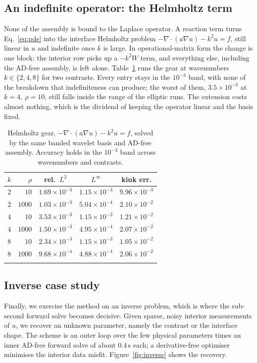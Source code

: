 \documentclass[pdflatex,sn-mathphys-num]{sn-jnl}%
\theoremstyle{thmstyleone}%
\theoremstyle{thmstyletwo}%
\theoremstyle{thmstylethree}%
\begin{document}
\subsection{An indefinite operator: the Helmholtz term}\label{subsec:helmholtz}
None of the assembly is bound to the Laplace operator. A reaction term turns Eq.~\eqref{eq:pde} into the interface Helmholtz problem $-\nabla\!\cdot\!(a\nabla u)-k^2 u = f$, still linear in $u$ and indefinite once $k$ is large. In operational-matrix form the change is one block: the interior row picks up a $-k^2 W$ term, and everything else, including the AD-free assembly, is left alone. Table~\ref{tab:helmholtz} runs the gear at wavenumbers $k\in\{2,4,8\}$ for two contrasts. Every entry stays in the $10^{-3}$ band, with none of the breakdown that indefiniteness can produce; the worst of them, $3.5\times10^{-3}$ at $k=4,\ \rho=10$, still falls inside the range of the elliptic runs. The extension costs almost nothing, which is the dividend of keeping the operator linear and the basis fixed.

\begin{table}[t]
\caption{Helmholtz gear, $-\nabla\!\cdot\!(a\nabla u)-k^2u=f$, solved by the same banded wavelet basis and AD-free assembly. Accuracy holds in the $10^{-3}$ band across wavenumbers and contrasts.}\label{tab:helmholtz}%
\begin{tabular}{@{}rrccc@{}}
\toprule
$k$ & $\rho$ & rel.\ $L^2$ & $L^\infty$ & kink err. \\
\midrule
$2$ & $10$   & $1.69\times10^{-3}$ & $1.15\times10^{-3}$ & $9.96\times10^{-3}$ \\
$2$ & $1000$ & $1.03\times10^{-3}$ & $5.04\times10^{-4}$ & $2.10\times10^{-2}$ \\
$4$ & $10$   & $3.53\times10^{-3}$ & $1.15\times10^{-3}$ & $1.21\times10^{-2}$ \\
$4$ & $1000$ & $1.50\times10^{-3}$ & $4.95\times10^{-4}$ & $2.07\times10^{-2}$ \\
$8$ & $10$   & $2.34\times10^{-3}$ & $1.15\times10^{-3}$ & $1.05\times10^{-2}$ \\
$8$ & $1000$ & $9.68\times10^{-4}$ & $4.88\times10^{-4}$ & $2.06\times10^{-2}$ \\
\botrule
\end{tabular}
\end{table}

\subsection{Inverse case study}\label{subsec:inverse}
Finally, we exercise the method on an inverse problem, which is where the sub-second forward solve becomes decisive. Given sparse, noisy interior measurements of $u$, we recover an unknown parameter, namely the contrast or the interface shape. The scheme is an outer loop over the few physical parameters times an inner AD-free forward solve of about $0.4$\,s each; a derivative-free optimiser minimises the interior data misfit. Figure~\ref{fig:inverse} shows the recovery.
\end{document}
